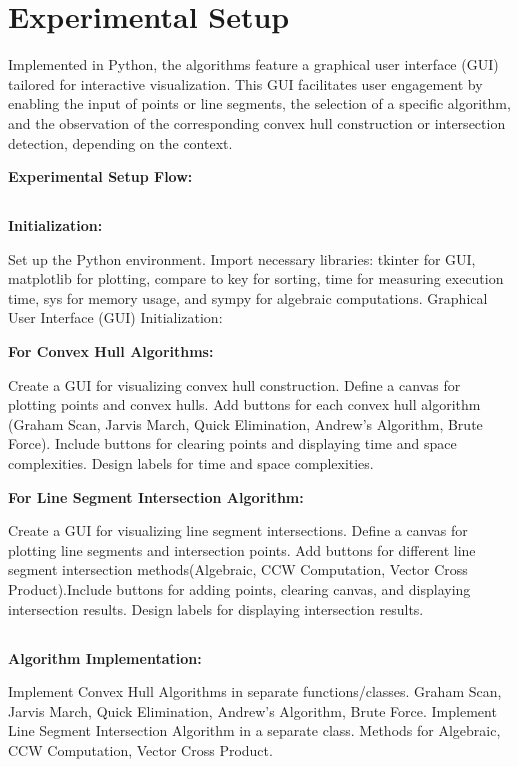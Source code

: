 \section{\textbf{Experimental Setup}}

Implemented in Python, the algorithms feature a graphical user interface (GUI) tailored for interactive visualization.
This GUI facilitates user engagement by enabling the input of points or line segments, the selection of a specific
algorithm, and the observation of the corresponding convex hull construction or intersection detection, depending on
the context.


\textbf{Experimental Setup Flow:}
\subsection{}
\textbf{Initialization:}

Set up the Python environment.
Import necessary libraries: tkinter for GUI, matplotlib for plotting, compare to key for sorting, time for measuring execution time, sys for memory usage, and sympy for algebraic computations. Graphical User Interface (GUI) Initialization:

\textbf{For Convex Hull Algorithms:}

Create a GUI for visualizing convex hull construction. Define a canvas for plotting points and convex hulls. Add buttons for each convex hull algorithm (Graham Scan, Jarvis March, Quick Elimination, Andrew's Algorithm, Brute Force). Include buttons for clearing points and displaying time and space complexities.
Design labels for time and space complexities.

\textbf{For Line Segment Intersection Algorithm:} 

Create a GUI for visualizing line segment intersections.
Define a canvas for plotting line segments and intersection points. Add buttons for different line segment intersection methods(Algebraic, CCW Computation, Vector Cross Product).Include buttons for adding points, clearing canvas, and displaying intersection results. Design labels for displaying intersection results.

\subsection{}
\textbf{Algorithm Implementation:}

Implement Convex Hull Algorithms in separate functions/classes.
Graham Scan, Jarvis March, Quick Elimination, Andrew's Algorithm, Brute Force. Implement Line Segment Intersection Algorithm in a separate class. Methods for Algebraic, CCW Computation, Vector Cross Product.

